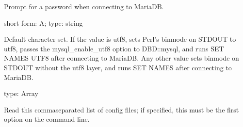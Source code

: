 \documentclass[letterpaper,10pt,english]{sphinxmanual}
\begin{document}
\begin{fulllineitems}
\label{\detokenize{mariadb-kill:cmdoption-mariadb-kill-ask-pass}}
\sphinxAtStartPar
Prompt for a password when connecting to MariaDB.

\end{fulllineitems}


\begin{fulllineitems}
\label{\detokenize{mariadb-kill:cmdoption-mariadb-kill-charset}}
\sphinxAtStartPar
short form: \sphinxhyphen{}A; type: string

\sphinxAtStartPar
Default character set.  If the value is utf8, sets Perl’s binmode on
STDOUT to utf8, passes the mysql\_enable\_utf8 option to DBD::mysql, and runs SET
NAMES UTF8 after connecting to MariaDB.  Any other value sets binmode on STDOUT
without the utf8 layer, and runs SET NAMES after connecting to MariaDB.

\end{fulllineitems}


\begin{fulllineitems}
\label{\detokenize{mariadb-kill:cmdoption-mariadb-kill-config}}
\sphinxAtStartPar
type: Array

\sphinxAtStartPar
Read this comma\sphinxhyphen{}separated list of config files; if specified, this must be the
first option on the command line.

\end{fulllineitems}
\end{document}
